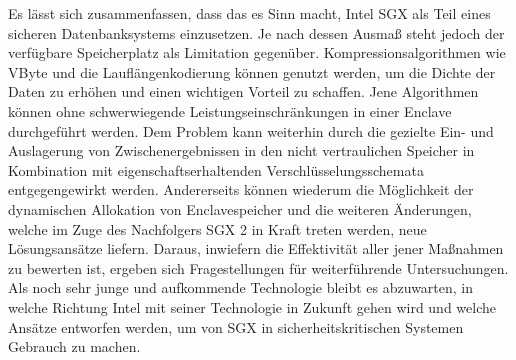 Es lässt sich zusammenfassen, dass das es Sinn macht, Intel \ac{SGX} als Teil eines sicheren Datenbanksystems einzusetzen. Je nach dessen Ausmaß steht jedoch der verfügbare Speicherplatz als Limitation gegenüber. Kompressionsalgorithmen wie VByte und die Lauflängenkodierung können genutzt werden, um die Dichte der Daten zu erhöhen und einen wichtigen Vorteil zu schaffen. Jene Algorithmen können ohne schwerwiegende Leistungseinschränkungen in einer Enclave durchgeführt werden. Dem Problem kann weiterhin durch die gezielte Ein- und Auslagerung von Zwischenergebnissen in den nicht vertraulichen Speicher in Kombination mit eigenschaftserhaltenden Verschlüsselungsschemata entgegengewirkt werden. Andererseits können wiederum die Möglichkeit der dynamischen Allokation von Enclavespeicher und die weiteren Änderungen, welche im Zuge des Nachfolgers \ac{SGX} 2 in Kraft treten werden, neue Lösungsansätze liefern. Daraus, inwiefern die Effektivität aller jener Maßnahmen zu bewerten ist, ergeben sich Fragestellungen für weiterführende Untersuchungen. Als noch sehr junge und aufkommende Technologie bleibt es abzuwarten, in welche Richtung Intel mit seiner Technologie in Zukunft gehen wird und welche Ansätze entworfen werden, um von \ac{SGX} in sicherheitskritischen Systemen Gebrauch zu machen.